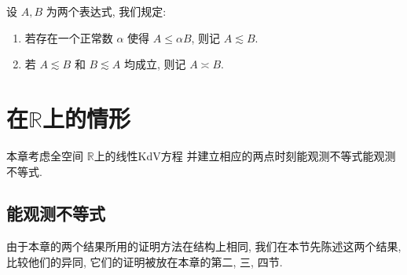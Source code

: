 \documentclass[master]{cugthesis}
\newcommand\R{\ensuremath{\mathbb{R}}}
\begin{document}
    设 $A, B$ 为两个表达式, 我们规定:
    \begin{enumerate}
        \item 若存在一个正常数 $\alpha$ 使得 $A\le \alpha B$, 则记 $A\lesssim B$.
        \item 若 $A\lesssim B$ 和 $B\lesssim A$ 均成立, 则记 $A\asymp B$.
    \end{enumerate}
    
    
    


    \chapter{在$\R$上的情形}
    本章考虑全空间 $\R $上的线性KdV方程
    并建立相应的两点时刻能观测不等式能观测不等式. 
    \section{能观测不等式}
  由于本章的两个结果所用的证明方法在结构上相同, 我们在本节先陈述这两个结果, 比较他们的异同, 它们的证明被放在本章的第二, 三, 四节. 
  
\end{document}

